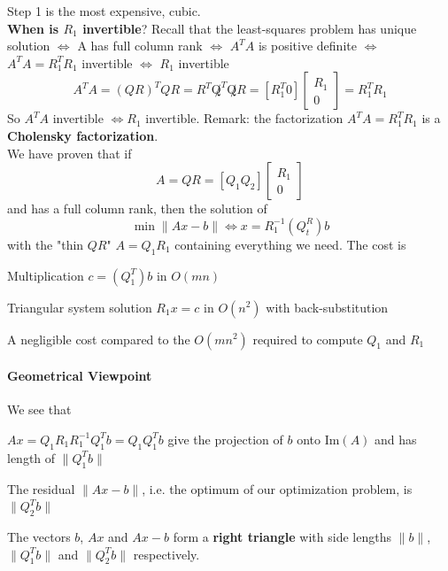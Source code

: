 \documentclass[10pt]{report}
\begin{document}
Step 1 is the most expensive, cubic.\\
\textbf{When is $R_1$ invertible}? Recall that the least-squares problem has unique solution $\Leftrightarrow$ A has full column rank $\Leftrightarrow$ $A^TA$ is positive definite $\Leftrightarrow$ $A^TA=R_1^TR_1$ invertible $\Leftrightarrow$ $R_1$ invertible
$$A^TA = (QR)^TQR = R^T\not Q^T\not QR = [R_1^T 0]\left[\begin{array}{c}
R_1\\0
\end{array}\right] = R_1^TR_1$$
So $A^TA$ invertible $\Leftrightarrow R_1$ invertible. Remark: the factorization $A^TA=R_1^TR_1$ is a \textbf{Cholensky factorization}.\\
We have proven that if $$A=QR=\left[Q_1 Q_2\right]\left[\begin{array}{c}R_1\\0\end{array}\right]$$ and has a full column rank, then the solution of $$\min\|Ax-b\| \Leftrightarrow x=R_1^{-1}(Q_t^R)b$$ with the "thin $QR$" $A=Q_1R_1$ containing everything we need. The cost is \begin{list}{}{}
	\item Multiplication $c = (Q_1^T)b$ in $O(mn)$
	\item Triangular system solution $R_1x = c$ in $O(n^2)$ with back-substitution
\end{list}
A negligible cost compared to the $O(mn^2)$ required to compute $Q_1$ and $R_1$
\paragraph{Geometrical Viewpoint} We see that
\begin{list}{}{}
	\item $Ax = Q_1R_1R_1^{-1}Q_1^Tb = Q_1Q_1^Tb$ give the projection of $b$ onto $\text{Im}(A)$ and has length of $\|Q_1^Tb\|$
	\item The residual $\|Ax-b\|$, i.e. the optimum of our optimization problem, is $\|Q_2^Tb\|$
	\item The vectors $b$, $Ax$ and $Ax-b$ form a \textbf{right triangle} with side lengths $\|b\|$, $\|Q_1^Tb\|$ and $\|Q_2^Tb\|$ respectively.
\end{list}
\pagebreak
\end{document}
